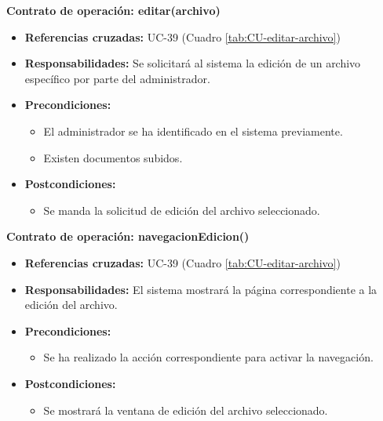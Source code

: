 \textbf{Contrato de operación: editar(archivo)}
\begin{itemize}
\item \textbf{Referencias cruzadas:} UC-39 (Cuadro \ref{tab:CU-editar-archivo})
\item \textbf{Responsabilidades:} Se solicitará al sistema la edición de un archivo específico por parte del administrador.
\item \textbf{Precondiciones:} 
 \begin{itemize}
\item El administrador se ha identificado en el sistema previamente.
\item Existen documentos subidos.
\end {itemize}
\item \textbf{Postcondiciones:} 
 \begin{itemize}
\item Se manda la solicitud de edición del archivo seleccionado.
\end {itemize}
\end {itemize}

\textbf{Contrato de operación: navegacionEdicion()}
\begin{itemize}
\item \textbf{Referencias cruzadas:} UC-39 (Cuadro \ref{tab:CU-editar-archivo})
\item \textbf{Responsabilidades:} El sistema mostrará la página correspondiente a la edición del archivo.
\item \textbf{Precondiciones:} 
 \begin{itemize}
\item Se ha realizado la acción correspondiente para activar la navegación.
\end {itemize}
\item \textbf{Postcondiciones:} 
 \begin{itemize}
\item Se mostrará la ventana de edición del archivo seleccionado.
\end {itemize}
\end {itemize}

